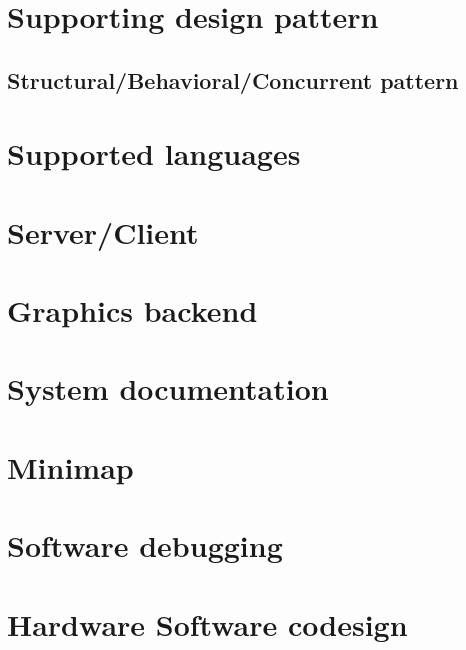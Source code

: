 \section{Supporting design pattern}


\subsection{Structural/Behavioral/Concurrent pattern}

\section{Supported languages}


\section{Server/Client}


\section{Graphics backend}


\section{System documentation}


\section{Minimap}


\section{Software debugging}


\section{Hardware Software codesign}


